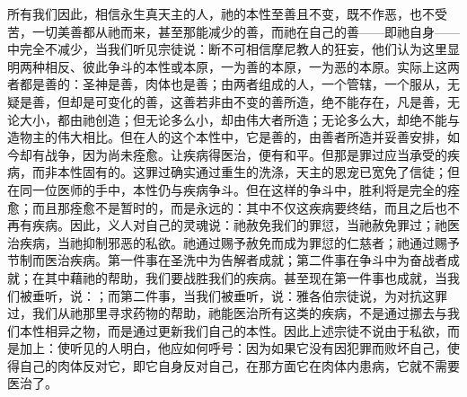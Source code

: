 所有我们因此，相信永生真天主的人，祂的本性至善且不变，既不作恶，也不受苦，一切美善都从祂而来，甚至那能减少的善，而祂在自己的善——即祂自身——中完全不减少，当我们听见宗徒说：断不可相信摩尼教人的狂妄，他们认为这里显明两种相反、彼此争斗的本性或本原，一为善的本原，一为恶的本原。实际上这两者都是善的：圣神是善，肉体也是善；由两者组成的人，一个管辖，一个服从，无疑是善，但却是可变化的善，这善若非由不变的善所造，绝不能存在，凡是善，无论大小，都由祂创造；但无论多么小，却由伟大者所造；无论多么大，却绝不能与造物主的伟大相比。但在人的这个本性中，它是善的，由善者所造并妥善安排，如今却有战争，因为尚未痊愈。让疾病得医治，便有和平。但那是罪过应当承受的疾病，而非本性固有的。这罪过确实通过重生的洗涤，天主的恩宠已宽免了信徒；但在同一位医师的手中，本性仍与疾病争斗。但在这样的争斗中，胜利将是完全的痊愈；而且那痊愈不是暂时的，而是永远的：其中不仅这疾病要终结，而且之后也不再有疾病。因此，义人对自己的灵魂说：祂赦免我们的罪愆，当祂赦免罪过；祂医治疾病，当祂抑制邪恶的私欲。祂通过赐予赦免而成为罪愆的仁慈者；祂通过赐予节制而医治疾病。第一件事在圣洗中为告解者成就；第二件事在争斗中为奋战者成就；在其中藉祂的帮助，我们要战胜我们的疾病。甚至现在第一件事也成就，当我们被垂听，说：；而第二件事，当我们被垂听，说：雅各伯宗徒说，为对抗这罪过，我们从祂那里寻求药物的帮助，祂能医治所有这类的疾病，不是通过挪去与我们本性相异之物，而是通过更新我们自己的本性。因此上述宗徒不说由于私欲，而是加上：使听见的人明白，他应如何呼号：因为如果它没有因犯罪而败坏自己，使得自己的肉体反对它，即它自身反对自己，在那方面它在肉体内患病，它就不需要医治了。\par

